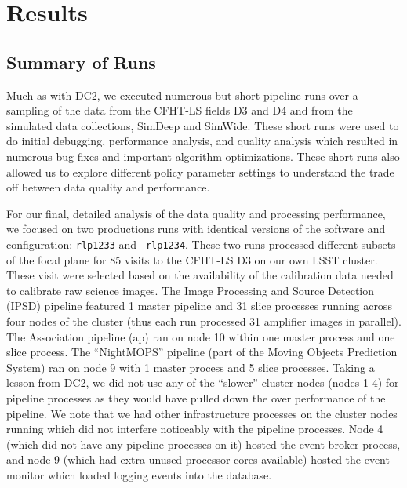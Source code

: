 \newcommand{\stc}[1]{\hbox to 2.5em{{#1}\hfil}}

\section{Results}

\subsection{Summary of Runs} \label{sec:recsummary}

Much as with DC2, we executed numerous but short pipeline runs over
a sampling of the data from the CFHT-LS fields D3 and D4 and from the
simulated data collections, SimDeep and SimWide.  These short runs
were used to do initial debugging, performance analysis, and quality
analysis which resulted in numerous bug fixes and important algorithm
optimizations.  These short runs also allowed us to explore different
policy parameter settings to understand the trade off between data
quality and performance.  

For our final, detailed analysis of the data quality and processing
performance, we focused on two productions runs with identical
versions of the software and configuration: {\tt rlp1233} and {\tt
rlp1234}.  These two runs
processed different subsets of the focal plane for 85 visits to the
CFHT-LS D3 on our own LSST cluster.  These visit were selected based
on the availability of the calibration data needed to calibrate raw
science images.  The Image Processing and Source Detection (IPSD)
pipeline featured 1 master pipeline and 31 slice processes running
across four nodes of the cluster (thus each run processed 31 amplifier
images in parallel).  The Association pipeline (ap) ran on node 10
within one master process and one slice process.  The ``NightMOPS''
pipeline (part of the Moving Objects Prediction System) ran on node 9
with 1 master process and 5 slice processes.  Taking a lesson from
DC2, we did not use any of the ``slower'' cluster nodes (nodes 1-4)
for pipeline processes as they would have pulled down the over
performance of the pipeline.  We note that we had other infrastructure
processes on the cluster nodes running which did not interfere
noticeably with the pipeline processes.  Node 4 (which did not have
any pipeline processes on it) hosted the event broker process, and
node 9 (which had extra unused processor cores available) hosted the
event monitor which loaded logging events into the database.

